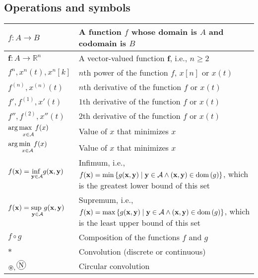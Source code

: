 \documentclass{article}
\begin{document}
\subsection{Operations and symbols}
\begin{xltabular}{\textwidth}{XX}
    \(f: A \rightarrow B\)                        & A function \(f\) whose domain is \(A\) and codomain is \(B\)\\ \hline
    \(\mathbf{f}: A \rightarrow \mathbb{R}^n\)    & A vector-valued function \(\mathbf{f}\), i.e., \(n \geq 2\)\\ \hline
    \(f^{n}, x^{n}(t), x^{n}[k]\)                 & \(n\)th power of the function \(f\), \(x[n]\) or \(x(t)\)\\ \hline
    \(f^{\left( n \right)},  x^{(n)}(t)\)         & \(n\)th derivative of the function \(f\) or \(x(t)\)\\ \hline
    \(f', f^{\left( 1 \right)}, x'(t)\)           & \(1\)th derivative of the function \(f\) or \(x(t)\)\\ \hline
    \(f'', f^{\left( 2 \right)}, x''(t)\)         & \(2\)th derivative of the function \(f\) or \(x(t)\)\\ \hline
    \(\argmax[x \in \mathcal{A}]{f(x)} \)         & Value of \(x\) that minimizes \(x\)\\ \hline
    \( \argmin[x \in \mathcal{A}]{f(x)} \)        & Value of \(x\) that minimizes \(x\)\\ \hline
    \(f(\mathbf{x})                               = \underset{\mathbf{y} \in \mathcal{A}}{\textnormal{inf }} g(\mathbf{x},\mathbf{y})\) & Infimum, i.e., \(f(\mathbf{x}) = \min{\left\{ g(\mathbf{x}, \mathbf{y}) \mid \mathbf{y} \in \mathcal{A} \wedge \left( \mathbf{x}, \mathbf{y} \right) \in \ensuremath{\operatorname{dom}\left(g\right)} \right\}}\), which is the greatest lower bound of this set \cite{boydConvexOptimization2004}\\ \hline
    \(f(\mathbf{x})                               = \underset{\mathbf{y} \in \mathcal{A}}{\textnormal{sup }} g(\mathbf{x},\mathbf{y})\) & Supremum, i.e., \(f(\mathbf{x}) = \max{\left\{ g(\mathbf{x}, \mathbf{y}) \mid \mathbf{y} \in \mathcal{A} \wedge \left( \mathbf{x}, \mathbf{y} \right) \in \ensuremath{\operatorname{dom}\left(g\right)} \right\}}\), which is the least upper bound of this set \cite{boydConvexOptimization2004}\\ \hline
    \(f \circ g\)                                 & Composition of the functions \(f\) and \(g\)\\ \hline
    \(*\) & Convolution (discrete or continuous)\\ \hline
    \(\circledast, \circconv{N}\)                 & Circular convolution \cite{oppenheimDiscreteTimeSignalProcessing2009,dinizDigitalSignalProcessing2010}\\
\end{xltabular}
\end{document}
